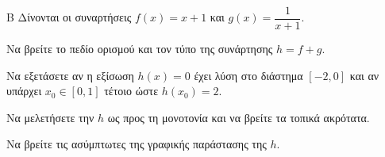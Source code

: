 \begin{thema}{Β}
Δίνονται οι συναρτήσεις $f(x) = x+1$ και $g(x) = \dfrac{1}{x+1}$.
\begin{erwthma}
\item Να βρείτε το πεδίο ορισμού και τον τύπο της συνάρτησης $h = f + g$.
\item Να εξετάσετε αν η εξίσωση $h(x)=0$ έχει λύση στο διάστημα $[-2, 0]$ και αν υπάρχει $x_0 \in [0, 1]$ τέτοιο ώστε $h(x_0)=2$.
\item Να μελετήσετε την $h$ ως προς τη μονοτονία και να βρείτε τα τοπικά ακρότατα.
\item Να βρείτε τις ασύμπτωτες της γραφικής παράστασης της $h$.
\end{erwthma}
\end{thema}
